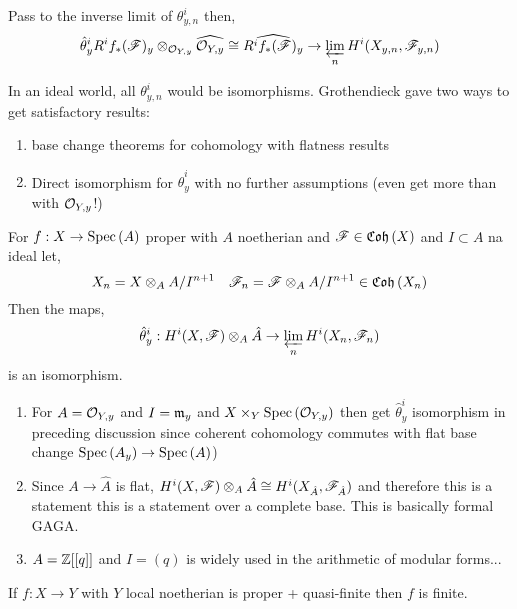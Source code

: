 \documentclass[12pt]{article}
\begin{document}
\begin{defn}
Pass to the inverse limit of $\theta^i_{y,n}$ then,
\[ \hat{\theta}^i_y R^i f_*(\mathscr{F})_y \otimes_{\mathcal{O}_{Y, y}} \widehat{\mathcal{O}_{Y, y}} \cong \widehat{R^i f_*(\mathscr{F})_y} \to \varprojlim_n H^i(X_{y,n}, \mathscr{F}_{y,n}) \]
\end{defn}

\begin{rmk}
In an ideal world, all $\theta^i_{y,n}$ would be isomorphisms. Grothendieck gave two ways to get satisfactory results:
\begin{enumerate}
\item base change theorems for cohomology with flatness results
\item Direct isomorphism for $\hat{\theta}^i_y$ with no further assumptions (even get more than with $\mathcal{O}_{Y, y}$!)
\end{enumerate}
\end{rmk}

\begin{thm}
For $f : X \to \mathrm{Spec}\left( A \right)$ proper with $A$ noetherian and $\mathscr{F} \in \mathfrak{Coh}\left(X\right)$ and $I \subset A$ na ideal let,
\[ X_n = X \otimes_A A /I^{n+1} \quad \mathscr{F}_n = \mathscr{F} \otimes_A A / I^{n+1} \in \mathfrak{Coh}\left(X_n\right) \]
Then the maps,
\[ \hat{\theta}^i_y : H^i(X, \mathscr{F}) \otimes_A \hat{A} \to \varprojlim_n H^i(X_n, \mathscr{F}_n) \]
is an isomorphism.
\end{thm}

\begin{rmk}
\begin{enumerate}
\item For $A = \mathcal{O}_{Y, y}$ and $I = \mathfrak{m}_y$ and $X \times_Y \mathrm{Spec}\left( \mathcal{O}_{Y, y} \right)$ then get $\hat{\theta}^i_y$ isomorphism in preceding discussion since coherent cohomology commutes with flat base change $\mathrm{Spec}\left( A_y \right) \to \mathrm{Spec}\left( A \right)$)
\item Since $A \to \hat{A}$ is flat, $H^i(X, \mathscr{F}) \otimes_A \hat{A} \cong H^i(X_{\hat{A}}, \mathscr{F}_{\hat{A}})$ and therefore this is a statement this is a statement over a complete base. This is basically formal GAGA. 
\item $A = \mathbb{Z}[[q]]$ and $I = (q)$ is widely used in the arithmetic of modular forms... 
\end{enumerate}
\end{rmk}

\begin{thm}
If $f : X \to Y$ with $Y$ local noetherian is proper + quasi-finite then $f$ is finite.
\end{thm}
\end{document}
